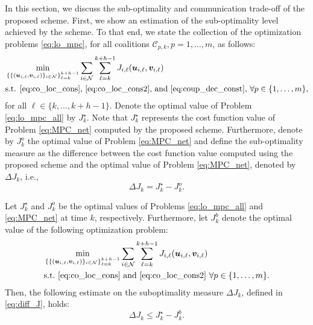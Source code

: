 In this section, we discuss the sub-optimality and communication trade-off of the proposed scheme. 
First, we show an estimation of the sub-optimality level achieved by the scheme. To that end, we state the collection of the optimization problems \eqref{eq:lo_mpc}, for all coalitions $\mathcal{C}_{p,k}, p=1,\dots,m$, as follows:
\begin{equation}
	\begin{aligned}
	&\min_{\{\{(\bm{u}_{i,\ell},\bm{v}_{i,\ell})\}_{i \in \mathcal{N}}\}_{\ell=k}^{k+h-1}} \sum_{i \in \mathcal{N}} \sum_{\ell =k}^{k+h-1}  J_{i,\ell}(\bm{u}_{i,\ell},\bm{v}_{i,\ell})\\
	&\text{s.t. \eqref{eq:co_loc_cons}, \eqref{eq:co_loc_cons2}, and \eqref{eq:coup_dec_const}, } \forall p \in \{1,\dots,m\},
	\end{aligned}
		\label{eq:lo_mpc_all}%
\end{equation}
for all $\ell \in\{k,\dots,k+h-1 \}$. Denote the optimal value of Problem \eqref{eq:lo_mpc_all} by $J^{\star}_k$. Note that $J^{\star}_k$ represents the cost function value of Problem \eqref{eq:MPC_net} computed by the proposed scheme. Furthermore, denote by $J_k^o$ the optimal value of Problem \eqref{eq:MPC_net} and define the sub-optimality measure as the difference between the cost function value computed using the proposed scheme and the optimal value of Problem \eqref{eq:MPC_net}, denoted by $\Delta J_k$, i.e., 
\begin{equation}
	\Delta J_k = J^{\star}_k-J^o_k. \label{eq:diff_J}
\end{equation}
\begin{prop}
	\label{prop:est_difJ}
	Let $J^{\star}_k$ and $J^o_k$ be the optimal values of Problems \eqref{eq:lo_mpc_all} and \eqref{eq:MPC_net} at time $k$, respectively. Furthermore, let $J^{b}_k$ denote the optimal value of the following optimization problem:
	\begin{equation}
	\begin{aligned}
	&\min_{\{\{(\bm{u}_{i,\ell},\bm{v}_{i,\ell})\}_{i \in \mathcal{N}}\}_{\ell=k}^{k+h-1}} \sum_{i \in \mathcal{N}} \sum_{\ell =k}^{k+h-1}  J_{i,\ell}(\bm{u}_{i,\ell},\bm{v}_{i,\ell})\\
	&\mathrm{s.t. } \text{ \eqref{eq:co_loc_cons} $\mathrm{and}$ \eqref{eq:co_loc_cons2} } \forall p \in \{1,\dots,m\}.
	\end{aligned}
	\label{eq:lb_mpc_all}%
	\end{equation}
	Then, the following estimate on the suboptimality measure $\Delta J_k$, defined in \eqref{eq:diff_J}, holds:
	\begin{equation}
		\Delta J_k \leq J^{\star}_k-J^b_k. \label{eq:est_diffJ}
	\end{equation}
\end{prop}
